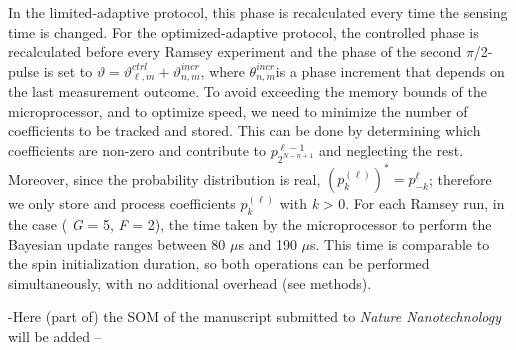 In the limited-adaptive protocol, this phase is recalculated every time the sensing time is changed. For the optimized-adaptive protocol, the controlled phase is recalculated before every Ramsey experiment and the phase of the second $\pi$/2-pulse is set to $\vartheta = \vartheta_{\ell,m}^{ctrl} + \vartheta_{n,m}^{incr}$, where $\theta_{n,m}^{incr}$is a phase increment that depends on the last measurement outcome\cite{Hayes_Phys.Rev.A_2014}.
To avoid exceeding the memory bounds of the microprocessor, and to optimize speed, we need to minimize the number of coefficients to be tracked and stored. This can be done by determining which coefficients are non-zero and contribute to $p_{2^{N-n+1}}^{\ell - 1}$ and neglecting the rest. Moreover, since the probability distribution is real, $(p_{k}^{(\ell)})^*=p_{-k}^{\ell}$; therefore we only store and process coefficients $p_{k}^{(\ell)}$ with \textit{k} > 0.
For each Ramsey run, in the case ( \textit{G} = 5, \textit{F} = 2), the time taken by the microprocessor to perform the Bayesian update ranges between 80 $\mu$s and 190 $\mu$s. This time is comparable to the spin initialization duration, so both operations can be performed simultaneously, with no additional overhead (see methods).

-Here (part of) the SOM of the manuscript submitted to {\em Nature Nanotechnology} will be added --




\clearpage



